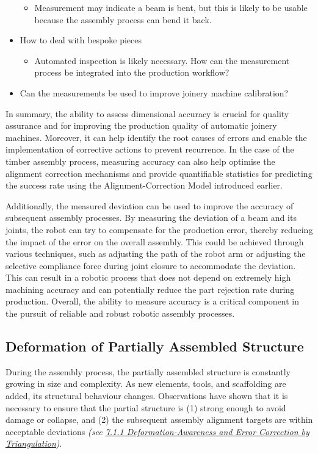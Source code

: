 \begin{itemize}
\begin{itemize}
	\item Measurement may indicate a beam is bent, but this is likely to be usable because the assembly process can bend it back.

\end{itemize}
	\item How to deal with bespoke pieces

\begin{itemize}
	\item Automated inspection is likely necessary. How can the measurement process be integrated into the production workflow?

\end{itemize}
	\item Can the measurements be used to improve joinery machine calibration?

\end{itemize}
In summary, the ability to assess dimensional accuracy is crucial for quality assurance and for improving the production quality of automatic joinery machines. Moreover, it can help identify the root causes of errors and enable the implementation of corrective actions to prevent recurrence. In the case of the timber assembly process, measuring accuracy can also help optimise the alignment correction mechanisms and provide quantifiable statistics for predicting the success rate using the Alignment-Correction Model introduced earlier.

Additionally, the measured deviation can be used to improve the accuracy of subsequent assembly processes. By measuring the deviation of a beam and its joints, the robot can try to compensate for the production error, thereby reducing the impact of the error on the overall assembly. This could be achieved through various techniques, such as adjusting the path of the robot arm or adjusting the selective compliance force during joint closure to accommodate the deviation. This can result in a robotic process that does not depend on extremely high machining accuracy and can potentially reduce the part rejection rate during production. Overall, the ability to measure accuracy is a critical component in the pursuit of reliable and robust robotic assembly processes.

\subsection{Deformation of Partially Assembled Structure}

During the assembly process, the partially assembled structure is constantly growing in size and complexity. As new elements, tools, and scaffolding are added, its structural behaviour changes. Observations have shown that it is necessary to ensure that the partial structure is (1) strong enough to avoid damage or collapse, and (2) the subsequent assembly alignment targets are within acceptable deviations \textit{(see \ul{7.1.1 Deformation-Awareness and Error Correction by Triangulation})}. 

